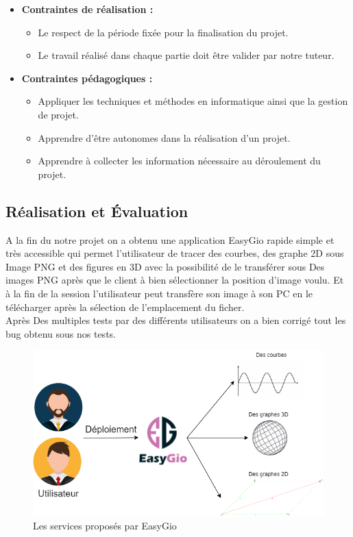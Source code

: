 \documentclass[a4paper]{report}
\begin{document}
\begin{itemize}
    \item \textbf{Contraintes de réalisation : }
    \begin{itemize}
        \item Le respect de la période fixée pour la finalisation du projet.
        \item Le travail réalisé dans chaque partie doit être valider par notre tuteur. 
    \end{itemize}\smallskip
    \item \textbf{Contraintes pédagogiques : }
    \begin{itemize}
        \item Appliquer les techniques et méthodes en informatique ainsi que la gestion de projet. 
        \item Apprendre d'être autonomes dans la réalisation d'un projet.
        \item Apprendre à collecter les information nécessaire au déroulement du projet.
    \end{itemize}    
\end{itemize}
\subsection{Réalisation et Évaluation}
A la fin du notre projet on a obtenu une application EasyGio rapide simple et très accessible qui permet l’utilisateur de tracer des courbes, des graphe 2D sous Image PNG et des figures en 3D avec la possibilité de le transférer sous Des images PNG après que le client à bien sélectionner la position d’image voulu. Et à la fin de la session l’utilisateur peut transfère son image à son PC en le télécharger après la sélection de l’emplacement du ficher.\\
Après Des multiples tests par des différents utilisateurs on a bien corrigé tout les bug obtenu sous nos tests.
\begin{figure}[!h]
    \centering
    \includegraphics[width=14cm]{images/EasyGioServices.png}
    \caption{Les services proposés par EasyGio}
    \label{fig:Les services proposés par EasyGio}
\end{figure}
\end{document}
